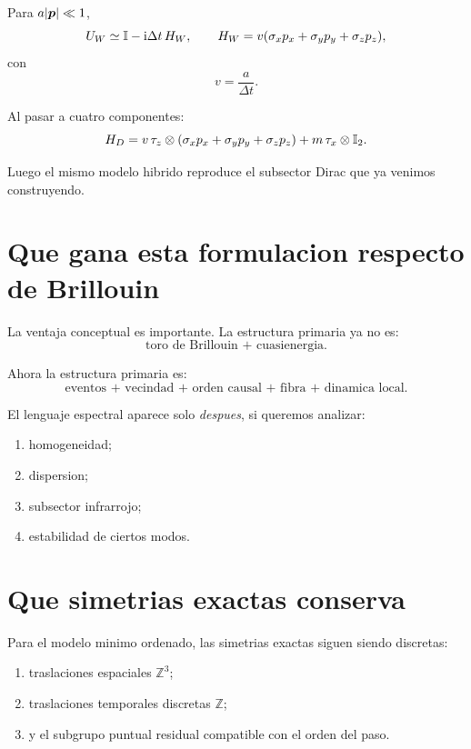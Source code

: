Para \(a|\bm{p}|\ll 1\),
\begin{equation}
U_W\simeq \mathbb{I}-\mathrm{i}\Delta t\,H_W,
\qquad
H_W=v(\sigma_x p_x+\sigma_y p_y+\sigma_z p_z),
\end{equation}
con
\begin{equation}
v=\frac{a}{\Delta t}.
\end{equation}

Al pasar a cuatro componentes:
\begin{equation}
H_D=
v\,\tau_z\otimes(\sigma_x p_x+\sigma_y p_y+\sigma_z p_z)
+m\,\tau_x\otimes\mathbb{I}_2.
\label{c28:eq:HD}
\end{equation}

Luego el mismo modelo hibrido reproduce el subsector Dirac que ya venimos construyendo.

\section{Que gana esta formulacion respecto de Brillouin}
La ventaja conceptual es importante. La estructura primaria ya no es:
\[
\text{toro de Brillouin + cuasienergia}.
\]

Ahora la estructura primaria es:
\[
\text{eventos + vecindad + orden causal + fibra + dinamica local}.
\]

El lenguaje espectral aparece solo \emph{despues}, si queremos analizar:
\begin{enumerate}[label=\arabic*.]
    \item homogeneidad;
    \item dispersion;
    \item subsector infrarrojo;
    \item estabilidad de ciertos modos.
\end{enumerate}

\section{Que simetrias exactas conserva}
Para el modelo minimo ordenado, las simetrias exactas siguen siendo discretas:
\begin{enumerate}[label=\arabic*.]
    \item traslaciones espaciales \(\mathbb{Z}^3\);
    \item traslaciones temporales discretas \(\mathbb{Z}\);
    \item y el subgrupo puntual residual compatible con el orden del paso.
\end{enumerate}


